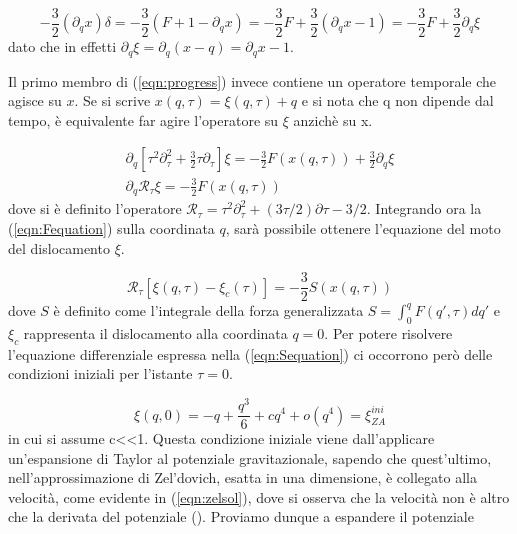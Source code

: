 \begin{equation}
    -\frac{3}{2} (\partial_q x )\delta = -\frac{3}{2}(F+1-\partial_q x) = -\frac{3}{2} F +\frac{3}{2} (\partial_q x - 1) = -\frac{3}{2} F + \frac{3}{2} \partial_q \xi    
\end{equation}
dato che in effetti $\partial_q \xi = \partial_q (x-q) = \partial_q x - 1$. 

Il primo membro di (\ref{eqn:progress}) invece contiene un operatore temporale che agisce su $x$. Se si scrive $x(q,\tau) = \xi(q, \tau) + q$ e si nota che q non 
dipende dal tempo, è equivalente far agire l'operatore su $\xi$ anzichè su x. 

\begin{gather}
    \partial_q \left[ \tau^2 \partial^2_{\tau}+\frac{3}{2}\tau\partial_{\tau} \right] \xi = -\frac{3}{2}F(x(q,\tau)) +\frac{3}{2}\partial_q \xi \\
    \label{eqn:Fequation}
    \partial_q \mathcal{R}_{\tau}\xi = -\frac{3}{2}F(x(q, \tau))
\end{gather}
dove si è definito l'operatore $\mathcal{R}_{\tau} = \tau^2\partial^2_{\tau} + (3\tau/2)\partial\tau-3/2$.
Integrando ora la (\ref{eqn:Fequation}) sulla coordinata $q$, sarà possibile ottenere l'equazione 
del moto del dislocamento $\xi$.

\begin{equation}
    \label{eqn:Sequation}
    \mathcal{R}_{\tau}[\xi(q, \tau)-\xi_c(\tau)] = -\frac{3}{2}S(x(q, \tau))
\end{equation}
dove $S$ è definito come l'integrale della forza generalizzata $S = \int_0^q F(q',\tau)dq'$ e $\xi_c$ rappresenta il 
dislocamento alla coordinata $q=0$.
Per potere risolvere l'equazione differenziale espressa nella (\ref{eqn:Sequation}) ci occorrono
però delle condizioni iniziali per l'istante $\tau = 0$.

\begin{equation}
    \label{eqn:initcond}
    \xi(q, 0) = -q + \frac{q^3}{6} + cq^4 + o(q^4) = \xi_{ZA}^{ini}
\end{equation}
in cui si assume c<\!<1. Questa condizione iniziale viene dall'applicare
un'espansione di Taylor al potenziale gravitazionale, sapendo che quest'ultimo, nell'approssimazione di Zel'dovich, 
esatta in una dimensione, è collegato alla velocità, come evidente in (\ref{eqn:zelsol}), dove si osserva che la 
velocità non è altro che la derivata del potenziale (\cite{zeldovich}). Proviamo dunque a espandere il potenziale

